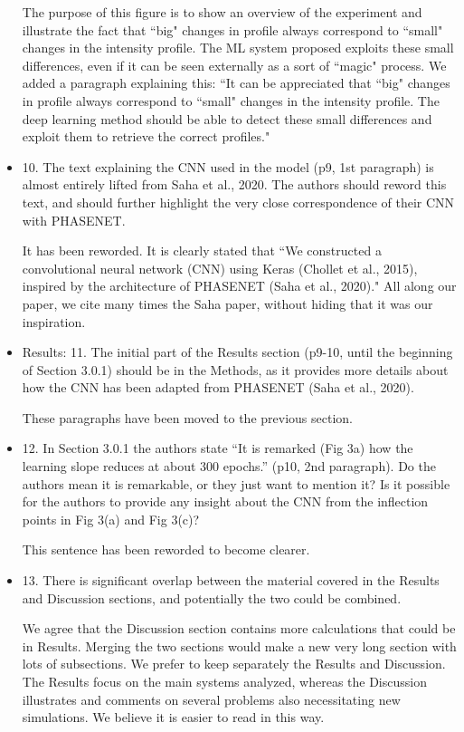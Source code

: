 \documentclass[11pt]{letter} %
\newcommand{\inred}[1]{{\color{red}#1}}
\begin{document}
\begin{letter}{}
\begin{itemize}
    \inred{The purpose of this figure is to show an overview of the experiment and illustrate the fact that ``big" changes in profile always correspond to ``small" changes in the intensity profile. The ML system proposed exploits these small differences, even if it can be seen externally as a sort of ``magic" process. We added a paragraph explaining this: ``It can be appreciated that ``big" changes in profile always correspond to ``small" changes in the intensity profile. The deep learning method should be able to detect these small differences and exploit them to retrieve the correct profiles."}
    

    \item 10. The text explaining the CNN used in the model (p9, 1st paragraph) is almost entirely lifted from Saha et al., 2020. The authors should reword this text, and should further highlight the very close correspondence of their CNN with PHASENET.
        
    \inred{It has been reworded. It is clearly stated that ``We constructed a convolutional neural network (CNN) using Keras (Chollet et al., 2015), inspired by the architecture of PHASENET (Saha et al., 2020)." All along our paper, we cite many times the Saha paper, without hiding that it was our inspiration.}
    
    \item Results: 11. The initial part of the Results section (p9-10, until the beginning of Section 3.0.1) should be in the Methods, as it provides more details about how the CNN has been adapted from PHASENET (Saha et al., 2020).
    
    \inred{These paragraphs have been moved to the previous section.}
    
    \item 12. In Section 3.0.1 the authors state “It is remarked (Fig 3a) how the learning slope reduces at about 300 epochs.” (p10, 2nd paragraph). Do the authors mean it is remarkable, or they just want to mention it? Is it possible for the authors to provide any insight about the CNN from the inflection points in Fig 3(a) and Fig 3(c)?
    
    \inred{This sentence has been reworded to become clearer.}
    
    \item 13. There is significant overlap between the material covered in the Results and Discussion sections, and potentially the two could be combined.
    
    \inred{We agree that the Discussion section contains more calculations that could be in Results. Merging the two sections would make a new very long section with lots of subsections. We prefer to keep separately the Results and Discussion. The Results focus on the main systems analyzed, whereas the Discussion illustrates and comments on several problems also necessitating new simulations. We believe it is easier to read in this way.}
    

\end{itemize}
\end{letter}
\end{document}
